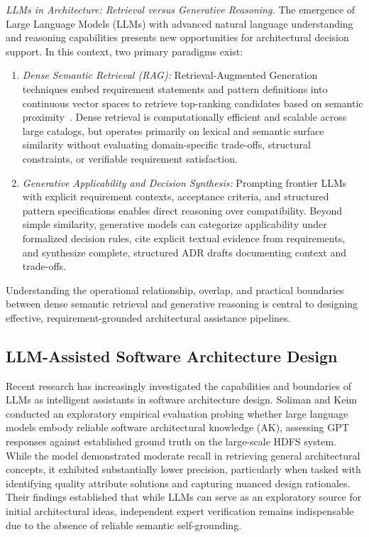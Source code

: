 \emph{LLMs in Architecture: Retrieval versus Generative Reasoning.}
The emergence of Large Language Models (LLMs) with advanced natural language
understanding and reasoning capabilities presents new opportunities for
architectural decision support. In this context, two primary paradigms exist:
\begin{enumerate}
    \item \emph{Dense Semantic Retrieval (RAG):} Retrieval-Augmented
    Generation techniques embed requirement statements and pattern definitions
    into continuous vector spaces to retrieve top-ranking candidates based on
    semantic proximity~\cite{lewis2020rag}. Dense retrieval is computationally
    efficient and scalable across large catalogs, but operates primarily on
    lexical and semantic surface similarity without evaluating domain-specific
    trade-offs, structural constraints, or verifiable requirement satisfaction.
    \item \emph{Generative Applicability and Decision Synthesis:} Prompting
    frontier LLMs with explicit requirement contexts, acceptance criteria,
    and structured pattern specifications enables direct reasoning over
    compatibility. Beyond simple similarity, generative models can categorize
    applicability under formalized decision rules, cite explicit textual
    evidence from requirements, and synthesize complete, structured ADR drafts
    documenting context and trade-offs.
\end{enumerate}
Understanding the operational relationship, overlap, and practical boundaries
between dense semantic retrieval and generative reasoning is central to designing
effective, requirement-grounded architectural assistance pipelines.

\subsection{LLM-Assisted Software Architecture Design}
\label{sec:related-work-architecture}

Recent research has increasingly investigated the capabilities and boundaries
of LLMs as intelligent assistants in software architecture design.
Soliman and Keim~\cite{soliman2025architectural} conducted an exploratory
empirical evaluation probing whether large language models embody reliable
software architectural knowledge (AK), assessing GPT responses against
established ground truth on the large-scale HDFS system. While the model
demonstrated moderate recall in retrieving general architectural concepts, it
exhibited substantially lower precision, particularly when tasked with identifying
quality attribute solutions and capturing nuanced design rationales.
Their findings established that while LLMs can serve as an exploratory source
for initial architectural ideas, independent expert verification remains
indispensable due to the absence of reliable semantic self-grounding.


